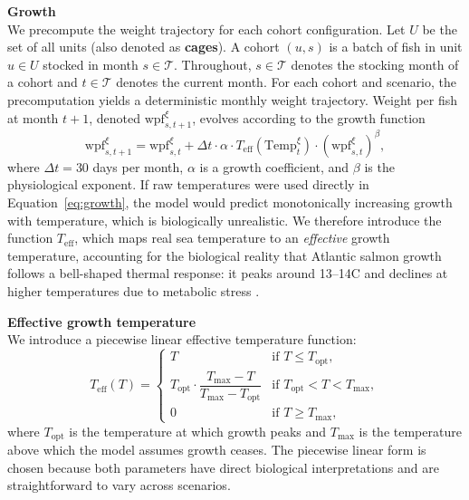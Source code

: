 \documentclass[12pt,a4paper]{article}
\begin{document}
\newpage
\noindent \textbf{Growth}\\
We precompute the weight trajectory for each cohort configuration. Let $U$ be the set of all units (also denoted as \textbf{cages}). A cohort $(u,s)$ is a batch of fish in unit $u \in U$ stocked in month $s \in \mathcal{T}$. Throughout, $s \in \mathcal{T}$ denotes the stocking month of a cohort and $t \in \mathcal{T}$ denotes the current month. For each cohort and scenario, the precomputation yields a deterministic monthly weight trajectory. Weight per fish at month $t+1$, denoted $\mathrm{wpf}^{\xi}_{s,t+1}$, evolves according to the growth function
\begin{equation}
\label{eq:growth}
  \mathrm{wpf}^{\xi}_{s,t+1} = \mathrm{wpf}^{\xi}_{s,t}
    + \Delta t \cdot \alpha \cdot T_{\mathrm{eff}}(\mathrm{Temp}^{\xi}_t)
      \cdot (\mathrm{wpf}^{\xi}_{s,t})^{\beta},
\end{equation}
where $\Delta t = 30$ days per month, $\alpha$ is a growth coefficient, and $\beta$ is the physiological exponent. If raw temperatures were used directly in Equation~\eqref{eq:growth}, the model would predict monotonically increasing growth with temperature, which is biologically unrealistic. We therefore introduce the function $T_{\mathrm{eff}}$, which maps real sea temperature to an \textit{effective} growth temperature, accounting for the biological reality that Atlantic salmon growth follows a bell-shaped thermal response: it peaks around 13--14\textdegree C and declines at higher temperatures due to metabolic stress \citep{Handeland2008}.
 
\noindent \textbf{Effective growth temperature} \\
We introduce a piecewise linear effective temperature function:
\begin{equation}
\label{eq:teff}
  T_{\mathrm{eff}}(T) =
  \begin{cases}
    T & \text{if } T \leq T_{\mathrm{opt}}, \\[4pt]
    T_{\mathrm{opt}} \cdot \dfrac{T_{\max} - T}{T_{\max} - T_{\mathrm{opt}}}
      & \text{if } T_{\mathrm{opt}} < T < T_{\max}, \\[4pt]
    0 & \text{if } T \geq T_{\max},
  \end{cases}
\end{equation}
where $T_{\mathrm{opt}}$ is the temperature at which growth peaks and $T_{\max}$ is the temperature above which the model assumes growth ceases. The piecewise linear form is chosen because both parameters have direct biological interpretations and are straightforward to vary across scenarios.
 
\end{document}
